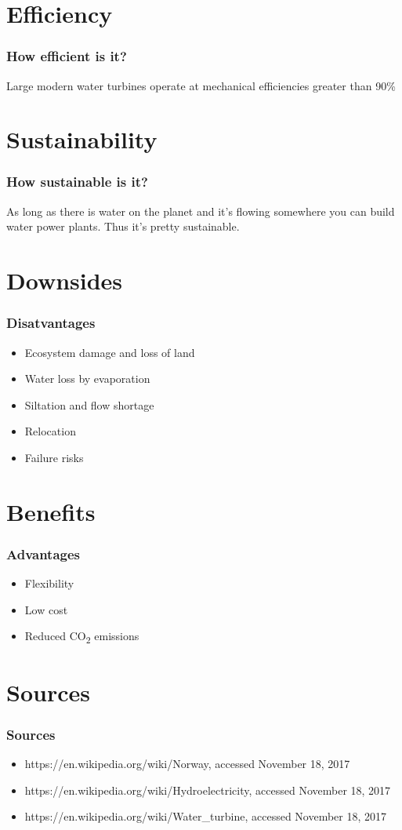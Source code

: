 \documentclass{beamer}
\begin{document}
\section{Efficiency}
\begin{frame}
\frametitle{How efficient is it?}
	Large modern water turbines operate at mechanical efficiencies greater than 90\%
\end{frame}

\section{Sustainability}
\begin{frame}
\frametitle{How sustainable is it?}
As long as there is water on the planet and it's flowing somewhere you can build water power plants. Thus it's pretty sustainable.
\end{frame}

\section{Downsides}
\begin{frame}
\frametitle{Disatvantages}
\begin{itemize}
	\item Ecosystem damage and loss of land
	\item Water loss by evaporation
	\item Siltation and flow shortage
	\item Relocation
	\item Failure risks
\end{itemize}
\end{frame}

\section{Benefits}
\begin{frame}
\frametitle{Advantages}
\begin{itemize}
	\item Flexibility
	\item Low cost
	\item Reduced CO\textsubscript{2} emissions
\end{itemize}
\end{frame}

\section{Sources}
\begin{frame}
\frametitle{Sources}
\begin{itemize}
	\item https://en.wikipedia.org/wiki/Norway, accessed November 18, 2017
	\item https://en.wikipedia.org/wiki/Hydroelectricity, accessed November 18, 2017
	\item https://en.wikipedia.org/wiki/Water\_turbine, accessed November 18, 2017
\end{itemize}

\end{frame}
\end{document}
